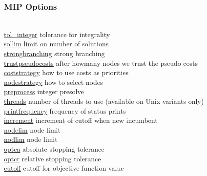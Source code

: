 \subsubsection{MIP Options}
\begin{tabbing}
\hspace {1.3in} \= \\
\hyperlink{tol_integer}
{tol\_integer} \> tolerance for integrality \\
\hyperlink{sollim}
{sollim} \> limit on number of solutions \\
\hyperlink{strongbranching}
{strongbranching} \> strong branching \\
\hyperlink{trustpseudocosts}
{trustpseudocosts} \> after howmany nodes we trust the pseudo costs \\
\hyperlink{coststrategy}
{coststrategy} \> how to use costs as priorities \\
\hyperlink{nodestrategy}
{nodestrategy} \> how to select nodes \\
\hyperlink{preprocess}
{preprocess} \> integer presolve \\
\hyperlink{threads}
{threads} \> number of threads to use (available on Unix variants only) \\
\hyperlink{printfrequency}
{printfrequency} \> frequency of status prints \\
\hyperlink{increment}
{increment} \> increment of cutoff when new incumbent \\
\hyperlink{nodelim}
{nodelim} \> node limit \\
\hyperlink{nodlim}
{nodlim} \> node limit \\
\hyperlink{optca}
{optca} \> absolute stopping tolerance \\
\hyperlink{optcr}
{optcr} \> relative stopping tolerance \\
\hyperlink{cutoff}
{cutoff} \> cutoff for objective function value
\end{tabbing}


